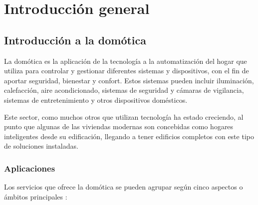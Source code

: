 
\chapter{Introducción general} %

\label{Chapter1} %
\label{IntroGeneral}


\newcommand{\keyword}[1]{\textbf{#1}}
\newcommand{\tabhead}[1]{\textbf{#1}}
\newcommand{\code}[1]{\texttt{#1}}
\newcommand{\file}[1]{\texttt{\bfseries#1}}
\newcommand{\option}[1]{\texttt{\itshape#1}}
\newcommand{\grados}{$^{\circ}$}



\section{Introducción a la domótica}

La domótica es la aplicación de la tecnología a la automatización del hogar que utiliza para controlar y gestionar diferentes sistemas y dispositivos, con el fin de aportar seguridad, bienestar y confort. Estos sistemas pueden incluir iluminación, calefacción, aire acondicionado, sistemas de seguridad y cámaras de vigilancia, sistemas de entretenimiento y otros dispositivos domésticos. \citep{1}

Este sector, como muchos otros que utilizan tecnología ha estado creciendo, al punto que algunas de las viviendas modernas son concebidas como hogares inteligentes desde su edificación, llegando a tener edificios completos con este tipo de soluciones instaladas.

\subsection{Aplicaciones}

Los servicios que ofrece la domótica se pueden agrupar según cinco aspectos o ámbitos principales \citep{2}:

